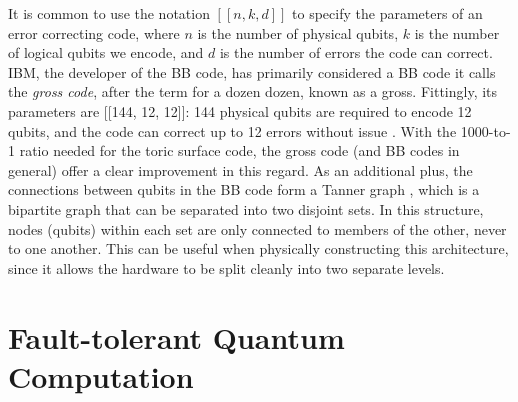 It is common to use the notation $[[n, k, d]]$ to specify the parameters of an error correcting code, where $n$ is the number of physical qubits, $k$ is the number of logical qubits we encode, and $d$ is the number of errors the code can correct. IBM, the developer of the BB code, has primarily considered a BB code it calls the \emph{gross code}, after the term for a dozen dozen, known as a gross. Fittingly, its parameters are [[144, 12, 12]]: 144 physical qubits are required to encode 12 qubits, and the code can correct up to 12 errors without issue \cite{Bravyi2024}. With the 1000-to-1 ratio needed for the toric surface code, the gross code (and BB codes in general) offer a clear improvement in this regard. As an additional plus, the connections between qubits in the BB code form a Tanner graph \cite{tannergraphwiki}, which is a bipartite graph that can be separated into two disjoint sets. In this structure, nodes (qubits) within each set are only connected to members of the other, never to one another. This can be useful when physically constructing this architecture, since it allows the hardware to be split cleanly into two separate levels.%


\newpage
\section{Fault-tolerant Quantum Computation}
